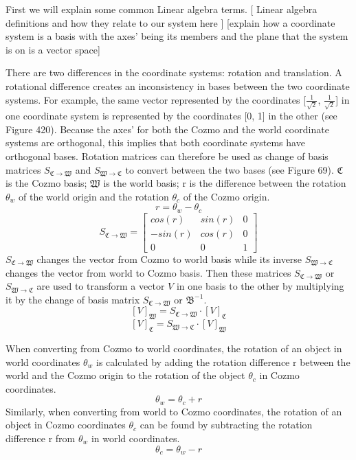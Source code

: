 \documentclass[jou,apacite]{apa6}
\begin{document}
First we will explain some common Linear algebra terms. 
[ Linear algebra definitions and how they relate to our system here ]
[explain how a coordinate system is a basis with the axes’ being its members and the plane that the system is on is a vector space]

There are two differences in the coordinate systems: rotation and translation. A rotational difference creates an inconsistency in bases between the two coordinate systems. For example, the same vector represented by the coordinates [$\frac{1}{\sqrt2}$, $\frac{1}{\sqrt2}$] in one coordinate system is represented by the coordinates [0, 1] in the other (see Figure 420). Because the axes’ for both the Cozmo and the world coordinate systems are orthogonal, this implies that both coordinate systems have orthogonal bases. Rotation matrices can therefore be used as change of basis matrices $S_{\mathfrak{C}\rightarrow\mathfrak{W}}$ and $S_{\mathfrak{W}\rightarrow\mathfrak{C}}$ to convert between the two bases (see Figure 69). $\mathfrak{C}$ is the Cozmo basis; $\mathfrak{W}$ is the world basis; r is the difference between the rotation $\theta_w$ of the world origin and the rotation $\theta_c$ of the Cozmo origin.
$$r = \theta_w - \theta_c$$
\[
S_{\mathfrak{C}\rightarrow\mathfrak{W}}=
\begin{bmatrix}
cos(r) & sin(r) & 0 \\
-sin(r) & cos(r) & 0 \\
0 & 0 & 1
\end{bmatrix}
\]
$S_{\mathfrak{C}\rightarrow\mathfrak{W}}$ changes the vector from Cozmo to world basis while its inverse $S_{\mathfrak{W}\rightarrow\mathfrak{C}}$ changes the vector from world to Cozmo basis.
 Then these matrices $S_{\mathfrak{C}\rightarrow\mathfrak{W}}$ or $S_{\mathfrak{W}\rightarrow\mathfrak{C}}$ are used to transform a vector $V$ in one basis to the other by multiplying it by the change of basis matrix $S_{\mathfrak{C}\rightarrow\mathfrak{W}}$ or $\mathfrak{B}^{-1}$.
 $$[V]_\mathfrak{W} = S_{\mathfrak{C}\rightarrow\mathfrak{W}} \cdot [V]_\mathfrak{C}$$
 $$[V]_\mathfrak{C} = S_{\mathfrak{W}\rightarrow\mathfrak{C}} \cdot [V]_\mathfrak{W}$$

When converting from Cozmo to world coordinates, the rotation of an object in world coordinates $\theta_w$ is calculated by adding the rotation difference r between the world and the Cozmo origin to the rotation of the object $\theta_c$ in Cozmo coordinates.
$$\theta_w = \theta_c + r$$
Similarly, when converting from world to Cozmo coordinates, the rotation of an object in Cozmo coordinates $\theta_c$ can be found by subtracting the rotation difference r from $\theta_w$ in world coordinates.
$$\theta_c = \theta_w - r$$
\end{document}
